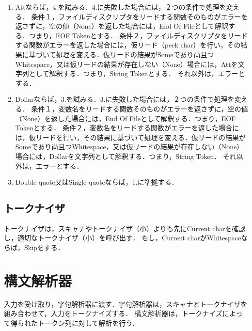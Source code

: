 \documentclass{article}
\begin{document}
\begin{enumerate}
\begin{enumerate}
                \item Attならば，4.を試みる．4.に失敗した場合には，２つの条件で処理を変える．\newline
                条件１，ファイルディスクリプタをリードする関数そのものがエラーを返さずに，空の値（None）を返した場合には，End Of Fileとして解釈する．つまり，EOF Tokenとする．\newline
                条件２，ファイルディスクリプタをリードする関数がエラーを返した場合には，仮リード（peek char）を行い，その結果に基づいて処理を変える．仮リードの結果がSomeであり尚且つWhitespace，又は仮リードの結果が存在しない（None）場合には，Attを文字列として解釈する．つまり，String Tokenとする．\newline
                それ以外は，エラーとする．
                \item Dollarならば，3.を試みる．3.に失敗した場合には，２つの条件で処理を変える．\newline
                条件１，変数名をリードする関数そのものがエラーを返さずに，空の値（None）を返した場合には，End Of Fileとして解釈する．つまり，EOF Tokenとする．
                条件２，変数名をリードする関数がエラーを返した場合には，仮リードを行い，その結果に基づいて処理を変える．仮リードの結果がSomeであり尚且つWhitespace，又は仮リードの結果が存在しない（None）場合には，Dollarを文字列として解釈する．つまり，String Token．\newline
                それ以外は，エラーとする．
                \item Double quote又はSingle quoteならば，1.に準拠する．
            \end{enumerate}
    \end{enumerate}
\subsection{トークナイザ}
トークナイザは，スキャナやトークナイザ（小）よりも先にCurrent charを確認し，適切なトークナイザ（小）を呼び出す．\newline
もし，Current charがWhitespaceならば，Skipをする．

\newpage

\section{構文解析器}
入力を受け取り，字句解析器に渡す．字句解析器は，スキャナとトークナイザを組み合わせて，入力をトークナイズする．\newline
構文解析器は，トークナイズによって得られたトークン列に対して解析を行う．
\end{document}
